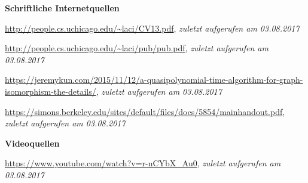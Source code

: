 \documentclass[a4paper]{article}
\newcommand{\babai}{\url{http://people.cs.uchicago.edu/~laci/CV13.pdf}}
\newcommand{\babaipublications}{\url{http://people.cs.uchicago.edu/~laci/pub/pub.pdf}}
\newcommand{\wlcoloring}{\url{https://simons.berkeley.edu/sites/default/files/docs/5854/mainhandout.pdf}}
\newcommand{\jeremykun}{\url{https://jeremykun.com/2015/11/12/a-quasipolynomial-time-algorithm-for-graph-isomorphism-the-details/}}
\newcommand{\babaivideo}{\url{https://www.youtube.com/watch?v=r-nCYbX_Au0}}
\newcommand{\visited}[1]{\emph{zuletzt aufgerufen am #1}}
\begin{document}
\noindent
{\textbf{Schriftliche Internetquellen}}
\begin{enumerate}[label={[\arabic*]}]
\item \babai, \visited{03.08.2017}
\item \babaipublications, \visited{03.08.2017}
\item \jeremykun, \visited{03.08.2017}
\item \wlcoloring, \visited{03.08.2017}
\end{enumerate}

\bigskip
\noindent
{\textbf{Videoquellen}}
\begin{enumerate}[label={[\arabic*]}]
\item \babaivideo, \visited{03.08.2017}
\end{enumerate}
\end{document}
